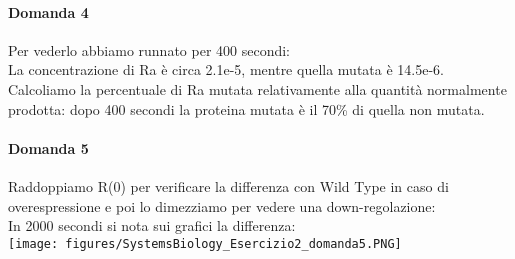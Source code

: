 \documentclass{article}
\begin{document}
\paragraph{Domanda 4}
Per vederlo abbiamo runnato per 400 secondi:\\
La concentrazione di Ra è circa 2.1e-5, mentre quella mutata è 14.5e-6.\\
Calcoliamo la percentuale di Ra mutata relativamente alla quantità normalmente prodotta: dopo 400 secondi la proteina mutata è il 70\% di quella non mutata.
\paragraph{Domanda 5}
Raddoppiamo R(0) per verificare la differenza con Wild Type in caso di overespressione e poi lo dimezziamo per vedere una down-regolazione:\\
In 2000 secondi si nota sui grafici la differenza:\\
\texttt{[image: figures/SystemsBiology\_Esercizio2\_domanda5.PNG]}
\end{document}
